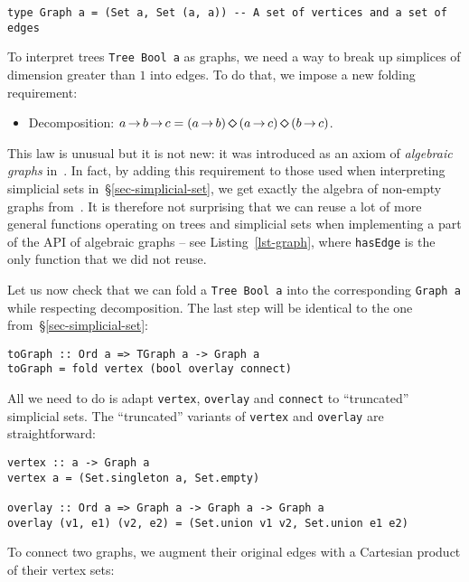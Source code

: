 \documentclass[english,submission]{programming}
\newcommand{\hcode}[1]{{\color{darkblue} \lstinline[keywordstyle={}]|#1|}} %
\newcommand{\dia}{\,\text{\raisebox{-0.3mm}{\Large $\diamond$}}\,}
\newcommand{\arr}{\,\text{$\rightarrow$}\,}
\begin{document}
\begin{lstlisting}
type Graph a = (Set a, Set (a, a)) -- A set of vertices and a set of edges
\end{lstlisting}

\noindent
To interpret trees \hcode{Tree Bool a} as graphs, we need a way to break up
simplices of dimension greater than $1$ into edges. To do that, we impose a new
folding requirement:

\begin{itemize}
    \item Decomposition:
          $a \arr b \arr c = (a \arr b) \dia (a \arr c) \dia (b \arr c)$.
\end{itemize}

\noindent
This law is unusual but it is not new: it was introduced as an axiom of
\emph{algebraic graphs} in~\cite{mokhov_alga}. In fact, by adding this
requirement to those used when interpreting simplicial sets
in~\S\ref{sec-simplicial-set}, we get exactly the algebra of non-empty graphs
from~\cite{mokhov_alga}. It is therefore not surprising that we can reuse a lot
of more general functions operating on trees and simplicial sets when
implementing a part of the API of algebraic graphs -- see
Listing~\ref{lst-graph}, where \hcode{hasEdge} is the only function that we did
not reuse.

Let us now check that we can fold a \hcode{Tree Bool a} into the corresponding
\hcode{Graph a} while respecting decomposition. The last step will be identical
to the one from~\S\ref{sec-simplicial-set}:

\begin{lstlisting}
toGraph :: Ord a => TGraph a -> Graph a
toGraph = fold vertex (bool overlay connect)
\end{lstlisting}

\noindent
All we need to do is adapt \hcode{vertex}, \hcode{overlay} and \hcode{connect}
to ``truncated'' simplicial sets. The ``truncated'' variants of \hcode{vertex}
and \hcode{overlay} are straightforward:

\begin{lstlisting}
vertex :: a -> Graph a
vertex a = (Set.singleton a, Set.empty)

overlay :: Ord a => Graph a -> Graph a -> Graph a
overlay (v1, e1) (v2, e2) = (Set.union v1 v2, Set.union e1 e2)
\end{lstlisting}

\noindent
To connect two graphs, we augment their original edges with a Cartesian product
of their vertex sets:
\end{document}
